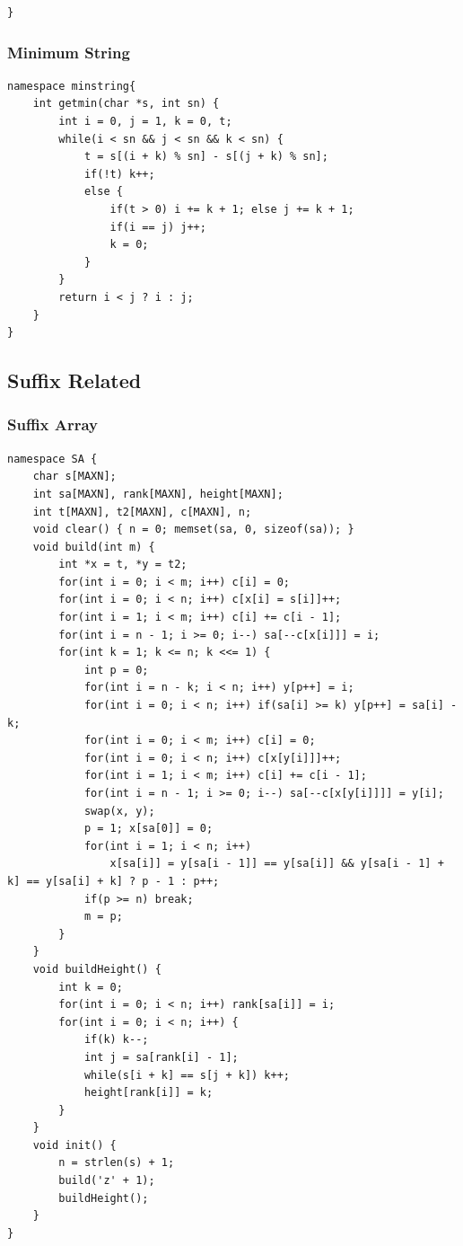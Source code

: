 \documentclass[10pt]{ctexart}
\begin{document}
{\begin{lstlisting}
}
\end{lstlisting}
\subsubsection{Minimum String}
\begin{lstlisting}
namespace minstring{
	int getmin(char *s, int sn) {
		int i = 0, j = 1, k = 0, t;
		while(i < sn && j < sn && k < sn) {
			t = s[(i + k) % sn] - s[(j + k) % sn];
			if(!t) k++;
			else {
				if(t > 0) i += k + 1; else j += k + 1;
				if(i == j) j++;
				k = 0;
			}
		}
		return i < j ? i : j;
	}
}
\end{lstlisting}
\subsection{Suffix Related}
\subsubsection{Suffix Array}
\begin{lstlisting}
namespace SA {
    char s[MAXN];
    int sa[MAXN], rank[MAXN], height[MAXN];
    int t[MAXN], t2[MAXN], c[MAXN], n;
    void clear() { n = 0; memset(sa, 0, sizeof(sa)); }
    void build(int m) {
        int *x = t, *y = t2;
        for(int i = 0; i < m; i++) c[i] = 0;
        for(int i = 0; i < n; i++) c[x[i] = s[i]]++;
        for(int i = 1; i < m; i++) c[i] += c[i - 1];
        for(int i = n - 1; i >= 0; i--) sa[--c[x[i]]] = i;
        for(int k = 1; k <= n; k <<= 1) {
            int p = 0;
            for(int i = n - k; i < n; i++) y[p++] = i;
            for(int i = 0; i < n; i++) if(sa[i] >= k) y[p++] = sa[i] - k;
            for(int i = 0; i < m; i++) c[i] = 0;
            for(int i = 0; i < n; i++) c[x[y[i]]]++;
            for(int i = 1; i < m; i++) c[i] += c[i - 1];
            for(int i = n - 1; i >= 0; i--) sa[--c[x[y[i]]]] = y[i];
            swap(x, y);
            p = 1; x[sa[0]] = 0;
            for(int i = 1; i < n; i++)
                x[sa[i]] = y[sa[i - 1]] == y[sa[i]] && y[sa[i - 1] + k] == y[sa[i] + k] ? p - 1 : p++;
            if(p >= n) break;
            m = p;
        }
    }
    void buildHeight() {
        int k = 0;
        for(int i = 0; i < n; i++) rank[sa[i]] = i;
        for(int i = 0; i < n; i++) {
            if(k) k--;
            int j = sa[rank[i] - 1];
            while(s[i + k] == s[j + k]) k++;
            height[rank[i]] = k;
        }
    }
    void init() {
        n = strlen(s) + 1;
        build('z' + 1);
        buildHeight();
    }
}
\end{lstlisting}
}
\end{document}
